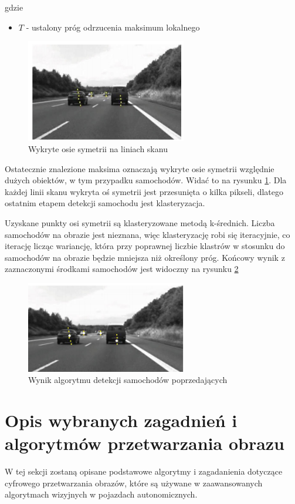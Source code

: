 gdzie
\begin{itemize}
\item $T$ - ustalony próg odrzucenia maksimum lokalnego
\end{itemize}


\begin{figure}
  \centering
  \includegraphics[width=7cm]{img/car_symmetry.png}
  \caption{Wykryte osie symetrii na liniach skanu\cite{T1}}
  \label{fig:car_detected}
\end{figure}

Ostatecznie znalezione maksima oznaczają wykryte osie symetrii względnie dużych obiektów, w tym przypadku samochodów. Widać to na rysunku \ref{fig:car_detected}. Dla każdej linii skanu wykryta oś symetrii jest przesunięta o kilka pikseli, dlatego ostatnim etapem detekcji samochodu jest klasteryzacja.

Uzyskane punkty osi symetrii są klasteryzowane metodą k-średnich. Liczba samochodów na obrazie jest nieznana, więc klasteryzację robi się iteracyjnie, co iterację licząc wariancję, która przy poprawnej liczbie klastrów w stosunku do samochodów na obrazie będzie mniejsza niż określony próg. Końcowy wynik z zaznaczonymi środkami samochodów jest widoczny na rysunku \ref{fig:car_end}

\begin{figure}
  \centering
  \includegraphics[width=7cm]{img/car_end.png}
  \caption{Wynik algorytmu detekcji samochodów poprzedających\cite{T1}}
  \label{fig:car_end}
\end{figure}

\section{Opis wybranych zagadnień i algorytmów przetwarzania obrazu}
\label{sec:vision_algs}
W tej sekcji zostaną opisane podstawowe algorytmy i zagadanienia dotyczące cyfrowego przetwarzania obrazów, które są używane w zaawansowanych algorytmach wizyjnych w pojazdach autonomicznych.

